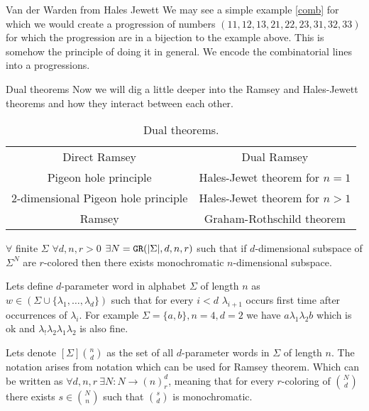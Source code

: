 \begin{topic}{Van der Warden from Hales Jewett}
	We may see a simple example \ref{comb} for which we would create a progression of numbers $(11, 12, 13, 21, 22, 23, 31, 32, 33)$ for which the progression are in a bijection to the example above. This is somehow the principle of doing it in general. We encode the combinatorial lines into a progressions.
\end{topic}

\begin{topic}{Dual theorems}
	Now we will dig a little deeper into the Ramsey and Hales-Jewett theorems and how they interact between each other.
	
	\begin{table}[!ht]\centering
		\begin{tabular}{| c | c |}
			\hline
			Direct Ramsey & Dual Ramsey \\
			Pigeon hole principle & Hales-Jewet theorem for $n = 1$ \\
			2-dimensional Pigeon hole principle & Hales-Jewet theorem for $n > 1$ \\
			Ramsey & Graham-Rothschild theorem \\
			\hline
		\end{tabular}
		\caption{Dual theorems.}
	\end{table}

	\begin{thm}
		$\forall$ finite $\Sigma$ $\forall d, n, r > 0$ $\exists N = \mathtt{GR}(|\Sigma|, d, n, r)$ such that if $d$-dimensional subspace of $\Sigma^N$ are $r$-colored then there exists monochromatic $n$-dimensional subspace.
		\label{gr-thm}
	\end{thm}

	
	Lets define $d$-parameter word in alphabet $\Sigma$ of length $n$ as $w \in (\Sigma \cup \{\lambda_1, \dots, \lambda_d\})$ such that for every $i < d$ $\lambda_{i+1}$ occurs first time after occurrences of $\lambda_i$. For example $\Sigma = \{a,b\}, n = 4, d = 2$ we have $a \lambda_1 \lambda_2 b$ which is ok and $\lambda_! \lambda_2 \lambda_1 \lambda_2$  is also fine.
	
	Lets denote $[\Sigma]\binom{n}{d}$ as the set of all $d$-parameter words in $\Sigma$ of length $n$. The notation arises from notation which can be used for Ramsey theorem. Which can be written as $\forall d, n, r \ \exists N: N \to (n)_r^d$, meaning that for every $r$-coloring of $\binom{N}{d}$ there exists $s \in \binom{N}{n}$ such that $\binom{s}{d}$ is monochromatic.
	

\end{topic}
